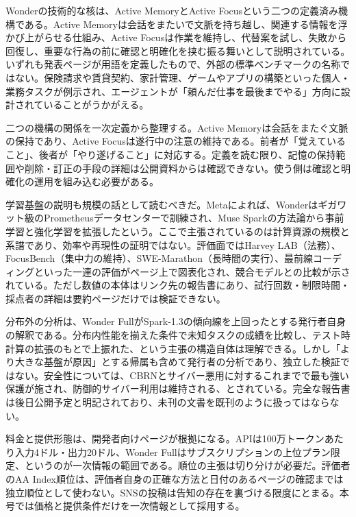 \documentclass[lualatex,a4paper,10pt]{jlreq}
\begin{document}
Wonderの技術的な核は、Active MemoryとActive Focusという二つの定義済み機構である。Active Memoryは会話をまたいで文脈を持ち越し、関連する情報を浮かび上がらせる仕組み、Active Focusは作業を維持し、代替案を試し、失敗から回復し、重要な行為の前に確認と明確化を挟む振る舞いとして説明されている。いずれも発表ページが用語を定義したもので、外部の標準ベンチマークの名称ではない。保険請求や賃貸契約、家計管理、ゲームやアプリの構築といった個人・業務タスクが例示され、エージェントが「頼んだ仕事を最後までやる」方向に設計されていることがうかがえる。
\cite{B01,B62,B63,B02,B64,B03}


二つの機構の関係を一次定義から整理する。Active Memoryは会話をまたぐ文脈の保持であり、Active Focusは遂行中の注意の維持である。前者が「覚えていること」、後者が「やり遂げること」に対応する。定義を読む限り、記憶の保持範囲や削除・訂正の手段の詳細は公開資料からは確認できない。使う側は確認と明確化の運用を組み込む必要がある。
\cite{B01,B62,B63,B02,B64,B03}


学習基盤の説明も規模の話として読むべきだ。Metaによれば、Wonderはギガワット級のPrometheusデータセンターで訓練され、Muse Sparkの方法論から事前学習と強化学習を拡張したという。ここで主張されているのは計算資源の規模と系譜であり、効率や再現性の証明ではない。評価面ではHarvey LAB（法務）、FocusBench（集中力の維持）、SWE-Marathon（長時間の実行）、最前線コーディングといった一連の評価がページ上で図表化され、競合モデルとの比較が示されている。ただし数値の本体はリンク先の報告書にあり、試行回数・制限時間・採点者の詳細は要約ページだけでは検証できない。
\cite{B01,B62,B63,B02,B64,B03}


分布外の分析は、Wonder FullがSpark-1.3の傾向線を上回ったとする発行者自身の解釈である。分布内性能を揃えた条件で未知タスクの成績を比較し、テスト時計算の拡張のもとで上振れた、という主張の構造自体は理解できる。しかし「より大きな基盤が原因」とする帰属も含めて発行者の分析であり、独立した検証ではない。安全性については、CBRNとサイバー悪用に対するこれまでで最も強い保護が施され、防御的サイバー利用は維持される、とされている。完全な報告書は後日公開予定と明記されており、未刊の文書を既刊のように扱ってはならない。
\cite{B01,B62,B63,B02,B64,B03}


料金と提供形態は、開発者向けページが根拠になる。APIは100万トークンあたり入力4ドル・出力20ドル、Wonder Fullはサブスクリプションの上位プラン限定、というのが一次情報の範囲である。順位の主張は切り分けが必要だ。評価者のAA Index順位は、評価者自身の正確な方法と日付のあるページの確認までは独立順位として使わない。SNSの投稿は告知の存在を裏づける限度にとまる。本号では価格と提供条件だけを一次情報として採用する。
\cite{B01,B62,B63,B02,B64,B03}
\end{document}
